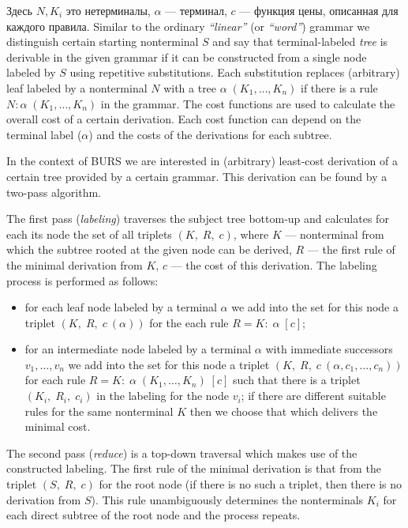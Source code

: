 Здесь $N, K_i$ это нетерминалы, $\alpha$ --- терминал,
$c$ --- функция цены, описанная для каждого правила.
Similar to the ordinary \emph{``linear''} (or \emph{``word''}) grammar we distinguish certain starting 
nonterminal $S$ 
and say that terminal-labeled \emph{tree} is derivable in the given grammar if it can be constructed from 
a single node labeled by $S$ using repetitive substitutions. Each substitution replaces (arbitrary) leaf 
labeled by a nonterminal $N$ with a tree $\alpha\;(K_1,\dots,K_n)$ if there is a rule 
$N:\alpha\;(K_1,\dots,K_n)$ in the grammar. The cost functions are used to calculate the overall cost 
of a certain derivation. Each cost function can depend on the terminal label ($\alpha$) and the costs 
of the derivations for each subtree.

In the context of BURS we are interested in (arbitrary) least-cost derivation of a certain tree provided by 
a certain grammar. This derivation can be found by a two-pass algorithm. 

The first pass (\emph{labeling}) traverses the subject tree bottom-up and calculates for each its node
the set of all triplets $(K,\;R,\;c)$, where $K$ --- nonterminal from which the subtree rooted at the given node
can be derived, $R$ --- the first rule of the minimal derivation from $K$, $c$ --- the cost of this derivation.
The labeling process is performed as follows:

\begin{itemize}
\item for each leaf node labeled by a terminal $\alpha$ we add into the set for this node a 
triplet $(K,\;R,\;c\:(\alpha))$ for the each rule $R=K:\;\alpha\;[c]$;
\item for an intermediate node labeled by a terminal $\alpha$ with immediate successors $v_1,\dots,v_n$ we
add into the set for this node a triplet $(K,\;R,\;c\:(\alpha,c_1,\dots,c_n))$ for each rule 
$R=K:\;\alpha\;(K_1,\dots,K_n)\;[c]$ such that there is a triplet $(K_i,\;R_i,\;c_i)$ in the labeling for
the node $v_i$; if there are different suitable rules for the same nonterminal $K$ then we choose that 
which delivers the minimal cost.
\end{itemize}

The second pass (\emph{reduce}) is a top-down traversal which makes use of the constructed labeling. The first
rule of the minimal derivation is that from the triplet $(S,\;R,\;c)$ for the root node (if there is no such a
triplet, then there is no derivation from $S$). This rule unambiguously determines the nonterminals $K_i$ for 
each direct subtree of the root node and the process repeats.

